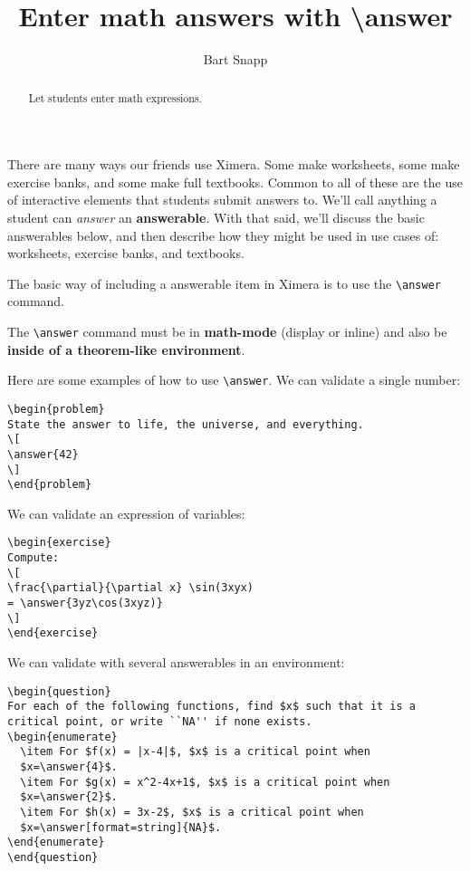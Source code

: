 \documentclass{ximera}
\title{Enter math answers with \textbackslash answer}
\author{Bart Snapp}
\begin{document}
\begin{abstract}
  Let students enter math expressions.
\end{abstract}
\maketitle

There are many ways our friends use Ximera. Some make worksheets, some make
exercise banks, and some make full textbooks. Common to all of these are the
use of interactive elements that students submit answers to. We'll call
anything a student can \textit{answer} an \textbf{answerable}.
With that said, we'll discuss the basic answerables below, and then describe
how they might be used in use cases of: worksheets, exercise banks, and
textbooks.


The basic way of including a answerable item in Ximera is to use the
\verb|\answer| command.

\begin{warning}
  The \verb|\answer| command must be in \textbf{math-mode} (display or inline)
  and also be \textbf{inside of a
    theorem-like environment}.
\end{warning}
Here are some examples of how to use \verb!\answer!. We can validate a single
number:
\begin{verbatim}
\begin{problem}
State the answer to life, the universe, and everything.
\[
\answer{42}
\]
\end{problem}
\end{verbatim}
We can validate an expression of variables:
\begin{verbatim}
\begin{exercise}
Compute:
\[
\frac{\partial}{\partial x} \sin(3xyx) 
= \answer{3yz\cos(3xyz)}
\]
\end{exercise}
\end{verbatim}
We can validate with several answerables in an environment:
\begin{verbatim}
\begin{question}
For each of the following functions, find $x$ such that it is a
critical point, or write ``NA'' if none exists.
\begin{enumerate}
  \item For $f(x) = |x-4|$, $x$ is a critical point when 
  $x=\answer{4}$.
  \item For $g(x) = x^2-4x+1$, $x$ is a critical point when 
  $x=\answer{2}$.
  \item For $h(x) = 3x-2$, $x$ is a critical point when 
  $x=\answer[format=string]{NA}$.
\end{enumerate}
\end{question}
\end{verbatim}
\end{document}

